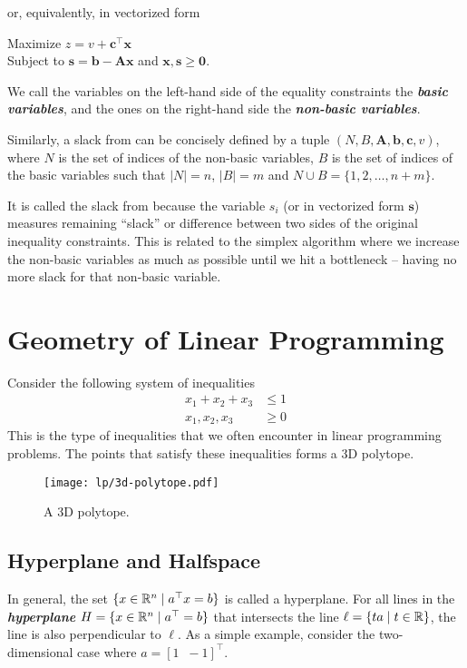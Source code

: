 or, equivalently, in vectorized form

Maximize $z = v + \mathbf{c}^\top \mathbf{x}$ \\
Subject to $\mathbf{s} = \mathbf{b} - \mathbf{A}\mathbf{x}$ and $\mathbf{x},\mathbf{s} \geq \boldsymbol{0}$.

We call the variables on the left-hand side of the equality constraints the \textit{\textbf{basic variables}}, and the ones on the right-hand side the \textit{\textbf{non-basic variables}}.

Similarly, a slack from can be concisely defined by a tuple $(N,B,\mathbf{A},\mathbf{b},\mathbf{c},v)$, where $N$ is the set of indices of the non-basic variables, $B$ is the set of indices of the basic variables such that $|N| = n$, $|B|=m$ and $N \cup B = \{1,2,\ldots,n+m\}$.

It is called the slack from because the variable $s_i$ (or in vectorized form $\mathbf{s}$) measures remaining ``slack'' or difference between two sides of the original inequality constraints. This is related to the simplex algorithm where we increase the non-basic variables as much as possible until we hit a bottleneck -- having no more slack for that non-basic variable.

\section{Geometry of Linear Programming}

Consider the following system of inequalities
$$
\begin{aligned}
    x_1 + x_2 + x_3 &\leq 1 \\
    x_1,x_2,x_3 &\geq 0
\end{aligned}
$$
This is the type of inequalities that we often encounter in linear programming problems. The points that satisfy these inequalities forms a 3D polytope.

\begin{figure}[htbp]
    \centering
    \texttt{[image: lp/3d-polytope.pdf]}
    \caption{A 3D polytope.}
    \label{fig:3d-polytope}
\end{figure}

\subsection{Hyperplane and Halfspace}   
In general, the set $\{ x \in \mathbb{R}^n \mid a^\top x = b \}$ is called a hyperplane. For all lines in the \textit{\textbf{hyperplane}} $H = \{ x \in \mathbb{R}^n \mid a^\top = b \}$ that intersects the line $\ell = \{ta \mid t \in \mathbb{R}\}$, the line is also perpendicular to $\ell$. As a simple example, consider the two-dimensional case where $a = [1\;\;-1]^\top$.

